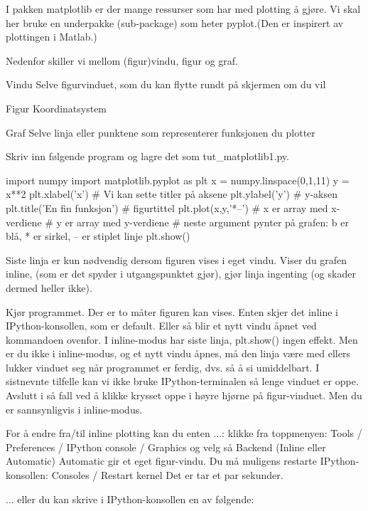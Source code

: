 I pakken matplotlib er der mange ressurser som har med plotting å gjøre. Vi skal her bruke en underpakke (sub-package) som heter pyplot.(Den er inspirert av plottingen i Matlab.)

Nedenfor skiller vi mellom (figur)vindu, figur og graf.
\begin{description}
\item{Vindu} Selve figurvinduet, som du kan flytte rundt på skjermen om du vil
\item{Figur} Koordinatsystem
\item{Graf}  Selve linja eller punktene som representerer funksjonen du plotter
\end{description}

Skriv inn følgende program og lagre det som tut\_{}matplotlib1.py. 

\begin{usncodebox}
import numpy 
import matplotlib.pyplot as plt 
x = numpy.linspace(0,1,11)
y = x**2
plt.xlabel('x')   # Vi kan sette titler på aksene
plt.ylabel('y')   # y-aksen
plt.title('En fin funksjon')    # figurtittel 
plt.plot(x,y,'*--') 
  # x er array med x-verdiene
  # y er array med y-verdiene
  # neste argument pynter på grafen: b er blå, * er sirkel, -- er stiplet linje
plt.show()   
\end{usncodebox}

Siste linja er kun nødvendig dersom figuren vises i eget vindu. Viser du grafen inline, (som er det spyder i utgangspunktet gjør), gjør linja ingenting (og skader dermed heller ikke). 

Kjør programmet. Der er to måter figuren kan vises. Enten skjer det inline i IPython-konsollen, som er default. Eller så blir et nytt vindu åpnet ved kommandoen ovenfor. I inline-modus har siste linja, plt.show() ingen effekt. Men er du ikke i inline-modus, og et nytt vindu åpnes, må den linja være med ellers lukker vinduet seg når programmet er ferdig, dvs. så å si umiddelbart. I sistnevnte tilfelle kan vi ikke bruke IPython-terminalen så lenge vinduet er oppe. Avslutt i så fall ved å klikke krysset oppe i høyre hjørne på figur-vinduet. Men du er sannsynligvis i inline-modus. 

For å endre fra/til inline plotting kan du enten ...:
klikke fra toppmenyen: 
Tools / Preferences / IPython console / Graphics
og velg så Backend (Inline eller Automatic) 
Automatic gir et eget figur-vindu.
Du må muligens restarte IPython-konsollen: Consoles / Restart kernel
Det er tar et par sekunder.

... eller du kan skrive i IPython-konsollen en av følgende:
\begin{usncodebox}
\end{usncodebox}

